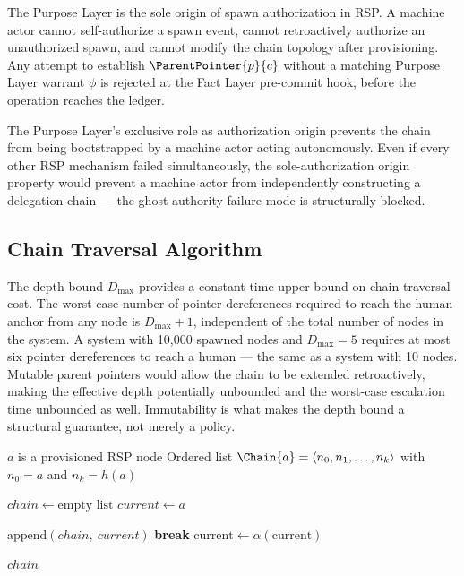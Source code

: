 \begin{prop}
\label{prop:exclusive-auth-origin}
The Purpose Layer is the sole origin of spawn authorization in RSP. A machine actor cannot self-authorize a spawn event, cannot retroactively authorize an unauthorized spawn, and cannot modify the chain topology after provisioning. Any attempt to establish $\ParentPointer{p}{c}$ without a matching Purpose Layer warrant $\phi$ is rejected at the Fact Layer pre-commit hook, before the operation reaches the ledger.

The Purpose Layer's exclusive role as authorization origin prevents the chain from being bootstrapped by a machine actor acting autonomously. Even if every other RSP mechanism failed simultaneously, the sole-authorization origin property would prevent a machine actor from independently constructing a delegation chain — the ghost authority failure mode is structurally blocked.
\end{prop}

\subsection{Chain Traversal Algorithm}
\label{sec:chain-traversal}

The depth bound $D_{\max}$ provides a constant-time upper bound on chain traversal cost. The worst-case number of pointer dereferences required to reach the human anchor from any node is $D_{\max} + 1$, independent of the total number of nodes in the system. A system with 10,000 spawned nodes and $D_{\max} = 5$ requires at most six pointer dereferences to reach a human — the same as a system with 10 nodes. Mutable parent pointers would allow the chain to be extended retroactively, making the effective depth potentially unbounded and the worst-case escalation time unbounded as well. Immutability is what makes the depth bound a structural guarantee, not merely a policy.

\begin{algorithm}
\caption{Chain-Traverse($a$) — Retrieve the delegation chain from node $a$ to human anchor}
\label{alg:chain-traverse}
\begin{algorithmic}[1]
\REQUIRE $a$ is a provisioned RSP node
\ENSURE Ordered list $\Chain{a} = \langle n_0, n_1, \ldots, n_k \rangle$ with $n_0 = a$ and $n_k = h(a)$

\STATE $chain \leftarrow \text{empty list}$
\STATE $current \leftarrow a$ 

    \STATE $\text{append}(chain,\ current)$ 
        \STATE \textbf{break} 
    \ENDIF
    \STATE $\text{current} \leftarrow \alpha(\text{current})$ 
\ENDWHILE

\RETURN $chain$
\end{algorithmic}
\end{algorithm}

